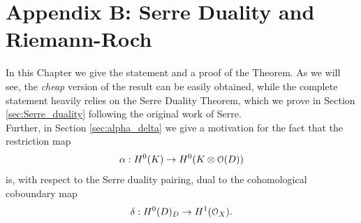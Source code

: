 
\chapter{Appendix B: Serre Duality and Riemann-Roch}\label{serre_duality} %



\ifpdf
    \graphicspath{{figures/}{figures/}{figures/}}
\else
    \graphicspath{{figures/}{figures/}}
\fi


In this Chapter we give the statement and a proof of the \RR Theorem. As we will see, the \emph{cheap} version of the result can be easily obtained, while the complete statement heavily relies on the Serre Duality Theorem, which we prove in Section \ref{sec:Serre_duality} following the original work of Serre.\\ 
Further, in Section \ref{sec:alpha_delta} we give a motivation for the fact that the restriction map 
$$ \alpha:H^0(K)\to H^0(K\otimes \mathcal{O}(D)) $$ 
is, with respect to the Serre duality pairing, dual to the cohomological coboundary map 
$$\delta:H^0(D)_D\to H^1(\mathcal{O}_X).$$

